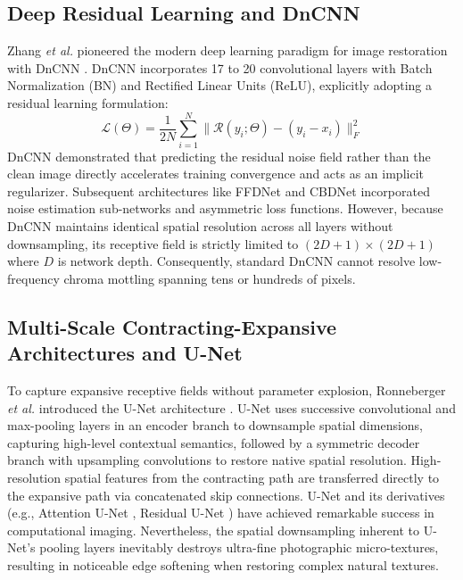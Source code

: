 \documentclass{ieeeaccess}
\begin{document}
\subsection{Deep Residual Learning and DnCNN}
Zhang \textit{et al.} pioneered the modern deep learning paradigm for image restoration with DnCNN \cite{zhang2017beyond}. DnCNN incorporates 17 to 20 convolutional layers with Batch Normalization (BN) and Rectified Linear Units (ReLU), explicitly adopting a residual learning formulation:
\begin{equation}
\mathcal{L}(\Theta) = \frac{1}{2N} \sum_{i=1}^N \| \mathcal{R}(y_i; \Theta) - (y_i - x_i) \|_F^2
\end{equation}
DnCNN demonstrated that predicting the residual noise field rather than the clean image directly accelerates training convergence and acts as an implicit regularizer. Subsequent architectures like FFDNet \cite{zhang2018ffdnet} and CBDNet \cite{guo2019toward} incorporated noise estimation sub-networks and asymmetric loss functions. However, because DnCNN maintains identical spatial resolution across all layers without downsampling, its receptive field is strictly limited to $(2D + 1) \times (2D + 1)$ where $D$ is network depth. Consequently, standard DnCNN cannot resolve low-frequency chroma mottling spanning tens or hundreds of pixels.

\subsection{Multi-Scale Contracting-Expansive Architectures and U-Net}
To capture expansive receptive fields without parameter explosion, Ronneberger \textit{et al.} introduced the U-Net architecture \cite{ronneberger2015u}. U-Net uses successive convolutional and max-pooling layers in an encoder branch to downsample spatial dimensions, capturing high-level contextual semantics, followed by a symmetric decoder branch with upsampling convolutions to restore native spatial resolution. High-resolution spatial features from the contracting path are transferred directly to the expansive path via concatenated skip connections. U-Net and its derivatives (e.g., Attention U-Net \cite{oktay2018attention}, Residual U-Net \cite{zhang2018road}) have achieved remarkable success in computational imaging. Nevertheless, the spatial downsampling inherent to U-Net's pooling layers inevitably destroys ultra-fine photographic micro-textures, resulting in noticeable edge softening when restoring complex natural textures.
\end{document}
